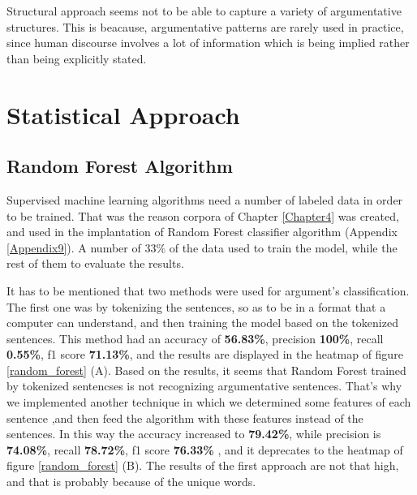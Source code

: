 \begin{table}[H]
	\centering
	\caption{Results of Structural Approach} 
	\label{structural_approach_results}
\end{table}

Structural approach seems not to be able to capture a variety of argumentative structures. This is beacause, argumentative patterns are rarely used in practice, since human discourse involves a lot of information which is being implied rather than being explicitly stated.

\newpage
\section{Statistical Approach}

\subsection{Random Forest Algorithm}
Supervised machine learning algorithms need a number of labeled data in order to be trained. That was the reason corpora of Chapter \ref{Chapter4} was created, and used in the implantation of Random Forest classifier algorithm (Appendix \ref{Appendix9}). A number of 33\% of the data used to train the model, while the rest of them to evaluate the results. 

It has to be mentioned that two methods were used for argument's classification. The first one was by tokenizing the sentences, so as to be in a format that a computer can understand, and then training the model based on the tokenized sentences. This method had an accuracy of \textbf{56.83\%}, precision \textbf{100\%}, recall \textbf{0.55\%}, f1 score \textbf{71.13\%}, and the results are displayed in the heatmap of figure \ref{random_forest} (A). Based on the results, it seems that Random Forest trained by tokenized sentencses is not recognizing argumentative sentences. That's why we implemented another technique in which we determined some features of each sentence ,and then feed the algorithm with these features instead of the sentences. In this way the accuracy increased to \textbf{79.42\%}, while precision is \textbf{74.08\%}, recall \textbf{78.72\%}, f1 score \textbf{76.33\%} , and it deprecates to the heatmap of figure \ref{random_forest} (B). The results of the first approach are not that high, and that is probably because of the unique words.

